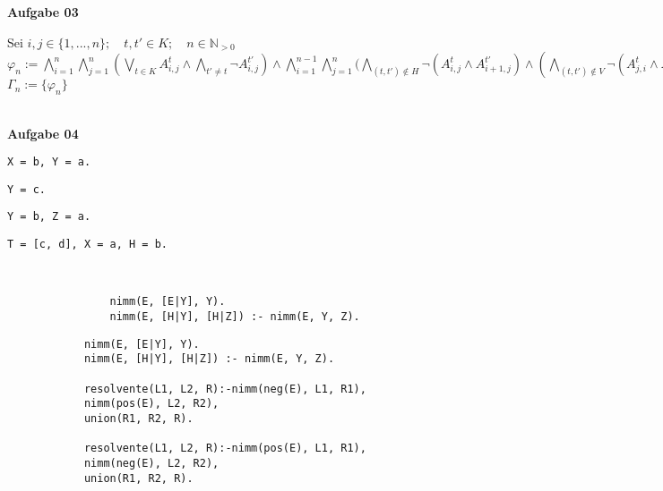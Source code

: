 \documentclass[a4paper,10pt]{article}
\begin{document}
	\textbf{Aufgabe 03}
	\begin{compactenum} [(a)]
		\item Sei $ i,j \in \{1,...,n\}; \quad t,t' \in K; \quad n \in \mathbb{N}_{>0} $\\
		$ \varphi_n := \bigwedge\limits_{i = 1}^n \bigwedge\limits_{j = 1}^n (\bigvee\limits_{t\in K} A_{i,j}^t \wedge \bigwedge\limits_{t'\neq t} \lnot A_{i,j}^{t'}) 
		\wedge \bigwedge\limits_{i=1}^{n-1} \bigwedge\limits_{j=1}^n (\bigwedge\limits_{(t,t') \not\in H} \lnot (A_{i,j}^t \wedge A_{i+1,j}^{t'}) \wedge (\bigwedge\limits_{(t,t') \not\in V} \lnot (A_{j,i}^t \wedge A_{j,i+1}^{t'})) $ \\
		$ \Gamma_n := \{\varphi_n\} $
		
		\item 
	\end{compactenum}\ \\

	\textbf{Aufgabe 04}
	\begin{compactenum} [(a)]
		\item \begin{compactenum} [(i)]
			\item \verb|X = b, Y = a.|
			\item \verb|Y = c.|
			\item \verb|Y = b, Z = a.|
			\item \verb|T = [c, d], X = a, H = b.|
		\end{compactenum}\
		\item 
		
		\newpage
		\item 
		\begin{verbatim}
				nimm(E, [E|Y], Y).
				nimm(E, [H|Y], [H|Z]) :- nimm(E, Y, Z).
		\end{verbatim}
		\item 
		\begin{verbatim}
			nimm(E, [E|Y], Y).
			nimm(E, [H|Y], [H|Z]) :- nimm(E, Y, Z).
			
			resolvente(L1, L2, R):-nimm(neg(E), L1, R1),
			nimm(pos(E), L2, R2),
			union(R1, R2, R).
			
			resolvente(L1, L2, R):-nimm(pos(E), L1, R1),
			nimm(neg(E), L2, R2),
			union(R1, R2, R).
		\end{verbatim}
		
		
		
		
		
		
		
		
		
		
		
		
	\end{compactenum}
\end{document}
